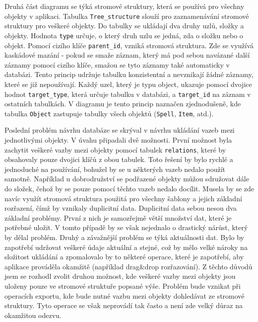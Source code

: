 \documentclass[thesis=B,czech]{resources/FITthesis}[2012/06/26]
\begin{document}
Druhá část diagramu se týká stromové struktury, která se používá pro všechny objekty v aplikaci. Tabulka \texttt{Tree\_structure} slouží pro zaznamenávání stromové struktury pro veškeré objekty. Do tabulky se ukládají dva druhy uzlů, složky a objekty. Hodnota \texttt{type} určuje, o který druh uzlu se jedná, zda o složku nebo o objekt. Pomocí cizího klíče \texttt{parent\_id}, vzniká stromová struktura. Zde se využívá kaskádové mazání - pokud se smaže záznam, který má pod sebou navázané další záznamy pomocí cizího klíče, smažou se tyto záznamy také automaticky v databázi. Tento princip udržuje tabulku konzistentní a nevznikají žádné záznamy, které se již nepoužívají. Každý uzel, který je typu object, ukazuje pomocí dvojice hodnot \texttt{target\_type}, která určuje tabulku v databázi, a \texttt{target\_id} na záznam v ostatních tabulkách. V diagramu je tento princip naznačen zjednodušeně, kde tabulka \texttt{Object} zastupuje tabulky všech objektů (\texttt{Spell}, \texttt{Item}, atd.). \par

Poslední problém návrhu databáze se skrýval v návrhu ukládání vazeb mezi jednotlivými objekty. V úvahu připadali dvě možnosti. První možnost byla zachytit veškeré vazby mezi objekty pomocí tabulek \texttt{relations}, které by obsahovaly pouze dvojici klíčů z obou tabulek. Toto řešení by bylo rychlé a jednoduché na používání, bohužel by se u některých vazeb nedalo použít samotně. Například u dobrodružství se podřazené objekty můžou sdružovat dále do složek, čehož by se pouze pomocí těchto vazeb nedalo docílit. Musela by se zde navíc využít stromová struktura použitá pro všechny šablony a jejich základní rozřazení, čímž by vznikaly duplicitní data. Duplicitní data sebou nesou dva základní problémy. První z nich je samozřejmě větší množství dat, které je potřebné uložit. V tomto případě by se však nejednalo o drastický nárůst, který by dělal problém. Druhý a závažnější problém se týká aktuálnosti dat. Bylo by zapotřebí udržovat veškeré údaje aktuální a stejné, což by mělo velké nároky na složitost ukládání a zpomalovalo by to některé operace, které je zapotřebí, aby aplikace prováděla okamžitě (například drag\&drop rozřazování). Z těchto důvodů jsem se rozhodl zvolit druhou možnost, kde veškeré vazby mezi objekty jsou uloženy pouze ve stromové struktuře popsané výše. Problém bude vznikat při operacích exportu, kde bude nutné vazbu mezi objekty dohledávat ze stromové struktury. Tyto operace se však neprovádí tak často a není zde velký důraz na okamžitou odezvu. 
\end{document}
